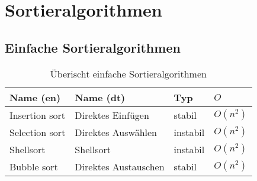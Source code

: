 



\section{Sortieralgorithmen}

\subsection{Einfache Sortieralgorithmen}

\begin{table}[h!]
        \centering
        \begin{tabular}{l l l l}
                Name (en)
			& Name (dt) 
			& Typ
			& $O$ \\
                \hline
                Insertion sort
			& Direktes Einfügen
			& stabil       
			& $O(n^2)$ \\
                Selection sort 
			& Direktes Auswählen      
			& instabil       
			& $O(n^2)$ \\
                Shellsort   
			& Shellsort    
			& instabil       
			& $O(n^2)$ \\
                Bubble sort   
			& Direktes Austauschen   
			& stabil        
			& $O(n^2)$
        \end{tabular}
        \caption{Überischt einfache Sortieralgorithmen}
        \label{table:sorting-algorithms}
\end{table}
